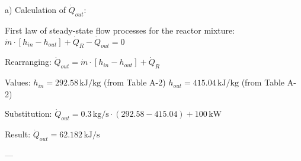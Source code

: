 a) Calculation of \( \dot{Q}_{out} \):  

First law of steady-state flow processes for the reactor mixture:  
\( \dot{m} \cdot [h_{in} - h_{out}] + \dot{Q}_R - \dot{Q}_{out} = 0 \)  

Rearranging:  
\( \dot{Q}_{out} = \dot{m} \cdot [h_{in} - h_{out}] + \dot{Q}_R \)  

Values:  
\( h_{in} = 292.58 \, \text{kJ/kg} \) (from Table A-2)  
\( h_{out} = 415.04 \, \text{kJ/kg} \) (from Table A-2)  

Substitution:  
\( \dot{Q}_{out} = 0.3 \, \text{kg/s} \cdot (292.58 - 415.04) + 100 \, \text{kW} \)  

Result:  
\( \dot{Q}_{out} = 62.182 \, \text{kJ/s} \)  

---